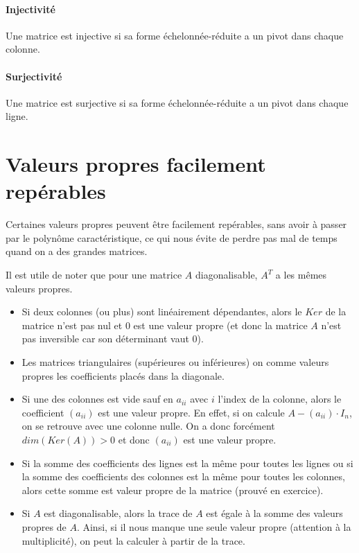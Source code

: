 \documentclass[10pt,a4paper]{book}
\begin{document}
\paragraph{Injectivité}
Une matrice est injective si sa forme échelonnée-réduite a un pivot dans chaque colonne.
\paragraph{Surjectivité} 
Une matrice est surjective si sa forme échelonnée-réduite a un pivot dans chaque ligne.

\section{Valeurs propres facilement repérables}
Certaines valeurs propres peuvent être facilement repérables, sans avoir à passer par le polynôme caractéristique, ce qui nous évite de perdre pas mal de temps quand on a des grandes matrices. \par 
Il est utile de noter que pour une matrice $A$ diagonalisable, $A^T$ a les mêmes valeurs propres.
\begin{itemize}
\item Si deux colonnes (ou plus) sont linéairement dépendantes, alors le $Ker$ de la matrice n'est pas nul et 0 est une valeur propre (et donc la matrice $A$ n'est pas inversible car son déterminant vaut 0). 
\item Les matrices triangulaires (supérieures ou inférieures) on comme valeurs propres les coefficients placés dans la diagonale.
\item Si une des colonnes est vide sauf en $a_{ii}$ avec $i$ l'index de la colonne, alors le coefficient $(a_{ii})$ est une valeur propre. En effet, si on calcule $A-(a_{ii})\cdot I_n$, on se retrouve avec une colonne nulle. On a donc forcément $dim(Ker(A)) > 0$ et donc $(a_{ii})$ est une valeur propre. 
\item Si la somme des coefficients des lignes est la même pour toutes les lignes ou si la somme des coefficients des colonnes est la même pour toutes les colonnes, alors cette somme est valeur propre de la matrice (prouvé en exercice).
\item Si $A$ est diagonalisable, alors la trace de $A$ est égale à la somme des valeurs propres de $A$. Ainsi, si il nous manque une seule valeur propre (attention à la multiplicité), on peut la calculer à partir de la trace.
\end{itemize}
\end{document}

